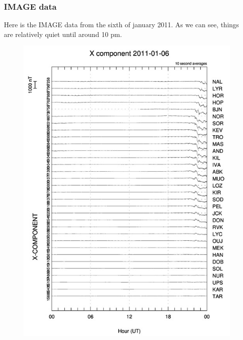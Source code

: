 \documentclass[norsk,a4paper,12pt]{article}
\begin{document}
\subsubsection{IMAGE data}
Here is the IMAGE data from the sixth of january 2011. As we can see, things are relatively quiet until around 10 pm. 
\begin{figure}[H]
\includegraphics[scale = 0.9]{Figures/X_gram.jpg}

\end{figure}
\end{document}
